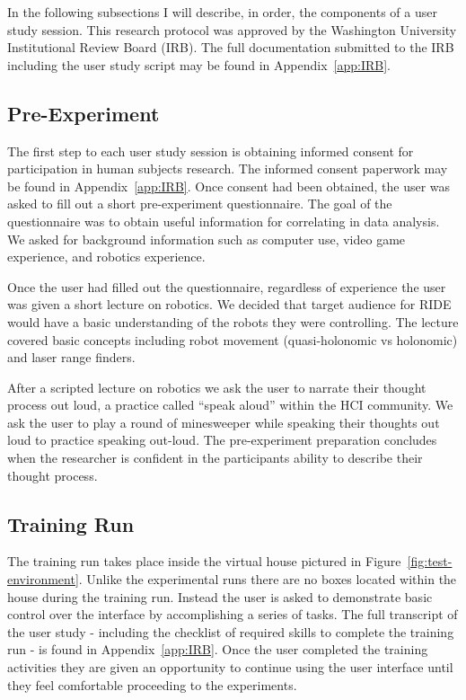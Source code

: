 In the following subsections I will describe, in order, the components of a user study session. This research protocol was approved by the Washington University Institutional Review Board (IRB). The full documentation submitted to the IRB including the user study script may be found in Appendix~\ref{app:IRB}.

\subsection{Pre-Experiment} %
\label{sub:pre_experiment}
The first step to each user study session is obtaining informed consent for participation in human subjects research. The informed consent paperwork may be found in Appendix~\ref{app:IRB}. Once consent had been obtained, the user was asked to fill out a short pre-experiment questionnaire. The goal of the questionnaire was to obtain useful information for correlating in data analysis. We asked for background information such as computer use, video game experience, and robotics experience.

Once the user had filled out the questionnaire, regardless of experience the user was given a short lecture on robotics. We decided that target audience for RIDE would have a basic understanding of the robots they were controlling. The lecture covered basic concepts including robot movement (quasi-holonomic  vs holonomic) and laser range finders.

After a scripted lecture on robotics we ask the user to narrate their thought process out loud, a practice called ``speak aloud'' within the HCI community. We ask the user to play a round of minesweeper while speaking their thoughts out loud to practice speaking out-loud. The pre-experiment preparation concludes when the researcher is confident in the participants ability to describe their thought process.

\subsection{Training Run} %
\label{sub:training_run}
The training run takes place inside the virtual house pictured in Figure~\ref{fig:test-environment}. Unlike the experimental runs there are no boxes located within the house during the training run. Instead the user is asked to demonstrate basic control over the interface by accomplishing a series of tasks. The full transcript of the user study - including the checklist of required skills to complete the training run - is found in Appendix~\ref{app:IRB}. Once the user completed the training activities they are given an opportunity to continue using the user interface until they feel comfortable proceeding to the experiments.

